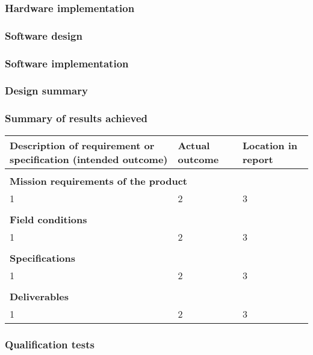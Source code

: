 \subsubsection{Hardware implementation}

\subsubsection{Software design}

\subsubsection{Software implementation}

\subsubsection{Design summary}



\subsubsection{Summary of results achieved}

\begin{tabular}{|p{5cm}|p{5cm}|p{5cm}|}
\hline
\textbf{Description of requirement or specification
(intended outcome)} & \textbf{Actual outcome}& \textbf{Location in report}\\
\hline
\multicolumn{3}{|l|}{}\\
\multicolumn{3}{|l|}{\textbf{Mission requirements of the product}}\\
\hline
1&2&3\\
\hline
\multicolumn{3}{|l|}{}\\
\multicolumn{3}{|l|}{\textbf{Field conditions}}\\
\hline
1&2&3\\
\hline
\multicolumn{3}{|l|}{}\\
\multicolumn{3}{|l|}{\textbf{Specifications}}\\
\hline
1&2&3\\
\hline
\multicolumn{3}{|l|}{}\\
\multicolumn{3}{|l|}{\textbf{Deliverables}}\\
\hline
1&2&3\\
\hline

\end{tabular}

\subsubsection{Qualification tests}